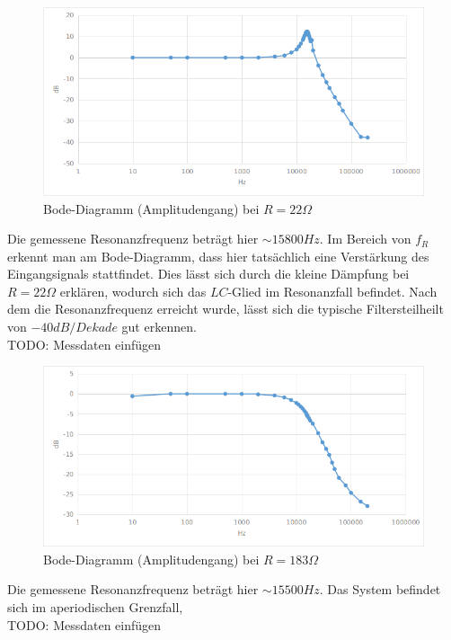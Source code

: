 \documentclass[12pt,a4paper,titlepage]{article}
\begin{document}
\begin{figure}[H]
  \centering
  \includegraphics[width=150mm]{bode_rlc_22.png}
  \caption{Bode-Diagramm (Amplitudengang) bei $R=22\Omega$}
\end{figure}
\noindent Die gemessene Resonanzfrequenz betr\"agt hier $\sim15800Hz$. Im Bereich von $f_R$ erkennt man am Bode-Diagramm, dass hier tats\"achlich eine Verstärkung des Eingangsignals stattfindet. Dies lässt sich durch die kleine Dämpfung bei $R=22\Omega$ erkl\"aren, wodurch sich das $LC$-Glied im Resonanzfall befindet. Nach dem die Resonanzfrequenz erreicht wurde, lässt sich die typische Filtersteilheilt von $-40dB/Dekade$ gut erkennen.\\
TODO: Messdaten einfügen

\begin{figure}[H]
  \centering
  \includegraphics[width=150mm]{bode_rlc_180.png}
  \caption{Bode-Diagramm (Amplitudengang) bei $R=183\Omega$}
\end{figure}
\noindent Die gemessene Resonanzfrequenz betr\"agt hier $\sim15500Hz$. Das System befindet sich im aperiodischen Grenzfall, \\
TODO: Messdaten einfügen
\end{document}
